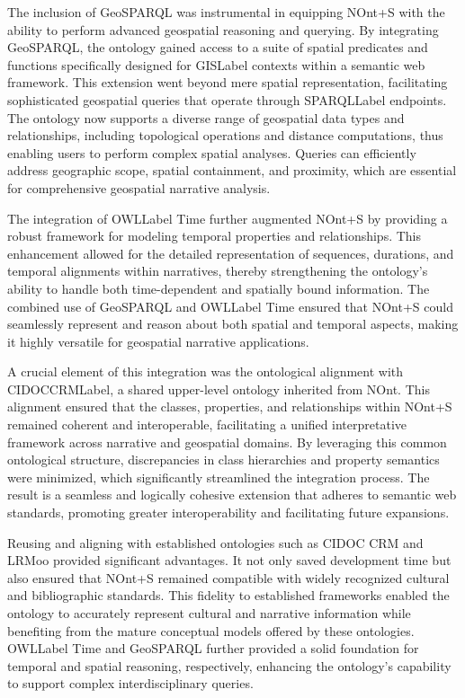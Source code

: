 The inclusion of GeoSPARQL \cite{matthewperryOGCGeoSPARQLGeographic2012} was instrumental in equipping NOnt+S with the ability to perform advanced geospatial reasoning and querying. By integrating GeoSPARQL, the ontology gained access to a suite of spatial predicates and functions specifically designed for \acrshort{GISLabel} contexts within a semantic web framework. This extension went beyond mere spatial representation, facilitating sophisticated geospatial queries that operate through \acrshort{SPARQLLabel} endpoints. The ontology now supports a diverse range of geospatial data types and relationships, including topological operations and distance computations, thus enabling users to perform complex spatial analyses. Queries can efficiently address geographic scope, spatial containment, and proximity, which are essential for comprehensive geospatial narrative analysis.

The integration of \acrshort{OWLLabel} Time further augmented NOnt+S by providing a robust framework for modeling temporal properties and relationships. This enhancement allowed for the detailed representation of sequences, durations, and temporal alignments within narratives, thereby strengthening the ontology’s ability to handle both time-dependent and spatially bound information. The combined use of GeoSPARQL and \acrshort{OWLLabel} Time ensured that NOnt+S could seamlessly represent and reason about both spatial and temporal aspects, making it highly versatile for geospatial narrative applications.

A crucial element of this integration was the ontological alignment with \acrshort{CIDOCCRMLabel}, a shared upper-level ontology inherited from NOnt. This alignment ensured that the classes, properties, and relationships within NOnt+S remained coherent and interoperable, facilitating a unified interpretative framework across narrative and geospatial domains. By leveraging this common ontological structure, discrepancies in class hierarchies and property semantics were minimized, which significantly streamlined the integration process. The result is a seamless and logically cohesive extension that adheres to semantic web standards, promoting greater interoperability and facilitating future expansions.

Reusing and aligning with established ontologies such as CIDOC CRM and LRMoo provided significant advantages. It not only saved development time but also ensured that NOnt+S remained compatible with widely recognized cultural and bibliographic standards. This fidelity to established frameworks enabled the ontology to accurately represent cultural and narrative information while benefiting from the mature conceptual models offered by these ontologies. \acrshort{OWLLabel} Time and GeoSPARQL further provided a solid foundation for temporal and spatial reasoning, respectively, enhancing the ontology’s capability to support complex interdisciplinary queries. 

